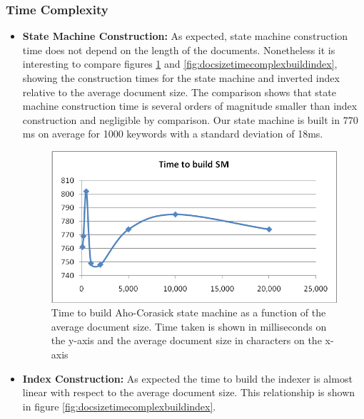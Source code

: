 \documentclass[10pt]{article}
\begin{document}
\subsubsection{Time Complexity}
\begin{itemize}
\item \textbf{State Machine Construction:} 
  As expected, state machine construction time
  does not depend on the length of the documents. Nonetheless it is
  interesting to compare figures \ref{fig:docsizetimecomplexbuildsm}
  and \ref{fig:docsizetimecomplexbuildindex}, showing the construction
  times for the state machine and inverted index relative to the
  average document size. The comparison shows that state machine
  construction time is several orders of magnitude smaller than index
  construction and negligible by comparison. Our state machine is
  built in 770 ms on average for 1000 keywords with a standard
  deviation of 18ms. 

  \begin{figure}[h!]
    \begin{center}
      \includegraphics[width=\textwidth,height=!]{docsizetimecomplexbuildsm}
    \end{center}
    \caption{Time to build Aho-Corasick state machine as a function of
      the average document size. Time taken is shown in milliseconds on the
      y-axis and the average document size in characters on the x-axis}
    \label{fig:docsizetimecomplexbuildsm}
  \end{figure} 

\item \textbf{Index Construction:} 
  As expected the time to build the indexer is almost linear with
  respect to the average document size. This relationship is shown in
  figure \ref{fig:docsizetimecomplexbuildindex}.


\end{itemize}
\end{document}
